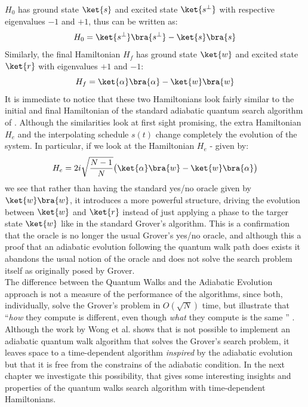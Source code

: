 $H_0$ has ground state $\ket{s}$ and excited state $\ket{s^\perp}$ with respective eigenvalues $-1$ and $+1$, thus can be written as:
\begin{equation}
  H_0  = \ket{s^\perp}\bra{s^\perp} - \ket{s}\bra{s}
\end{equation}
Similarly, the final Hamiltonian $H_f$ has ground state $\ket{w}$ and excited state $\ket{r}$ with eigenvalues $+1$ and $-1$:
\begin{equation}
  H_f =  \ket{\alpha}\bra{\alpha} - \ket{w}\bra{w}
\end{equation}
It is immediate to notice that these two Hamiltonians look fairly similar to the initial and final Hamiltonian of the standard adiabatic quantum search algorithm of . Although the similarities look at first sight promising, the extra Hamiltonian $H_e$ and the interpolating schedule $s(t)$ change completely the evolution of the system. In particular, if we look at the Hamiltonian $H_e$ - given by:
\begin{equation}
  H_e = 2i\sqrt{\frac{N-1}{N}}\big(\ket{\alpha}\bra{w} - \ket{w}\bra{\alpha}\big)
\end{equation}
we see that rather than having the standard yes/no oracle given by $\ket{w}\bra{w}$, it introduces a more powerful structure, driving the evolution between $\ket{w}$ and $\ket{r}$ instead of just applying a phase to the targer state $\ket{w}$ like in the standard Grover's algorithm. This is a confirmation that the oracle is no longer the usual Grover's yes/no oracle, and although this a proof that an adiabatic evolution following the quantum walk path does exists it abandons the usual notion of the oracle and does not solve the search problem itself as originally posed by Grover. \\

\noindent
The difference between the Quantum Walks and the Adiabatic Evolution approach is not a measure of the performance of the algorithms, since both, individually, solve the Grover's problem in $O(\sqrt{N})$ time, but illustrate that ``\textit{how} they compute is different, even though \textit{what} they compute is the same '' \cite{Wong2016}.\\

\noindent
Although the work by Wong et al. shows that is not possible to implement an adiabatic quantum walk algorithm that solves the Grover's search problem, it leaves space to a time-dependent algorithm \textit{inspired} by the adiabatic evolution but that it is free from the constrains of the adiabatic condition. In the next chapter we investigate this possibility, that gives some interesting insights and properties of the quantum walks search algorithm with time-dependent Hamiltonians.
